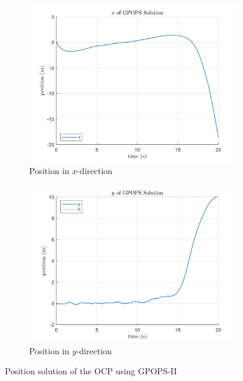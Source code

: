 \begin{figure}[ht]
	\centering
	\begin{subfigure}[b]{0.49\linewidth}
		\includegraphics[width=\linewidth]{figures/SolX.png}
		\caption{Position in $x$-direction}
		\label{fig:ocp1_x}
	\end{subfigure}
	\hfill
	\begin{subfigure}[b]{0.49\linewidth}
		\includegraphics[width=\linewidth]{figures/SolY.png}
		\caption{Position in $y$-direction}
		\label{fig:ocp1_y}
	\end{subfigure}
	\caption{Position solution of the OCP using GPOPS-II}
	\label{fig:ocp1_sol}
\end{figure}

